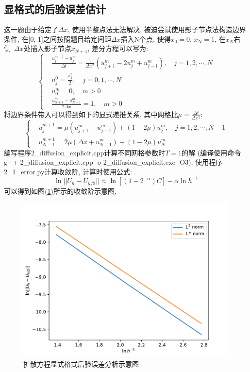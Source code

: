 \documentclass[a4paper,zihao=5,UTF8]{ctexart}
\def\dps{\displaystyle}
\begin{document}
	\subsection{显格式的后验误差估计}
	这一题由于给定了$\Delta x$, 使用半整点法无法解决, 被迫尝试使用影子节点法构造边界条件, 
	在[0, 1]之间按照题目给定间距$\Delta x$插入N个点, 使得$x_0 = 0, \,x_N = 1$, 在$x_N$右侧\
	$\Delta x$处插入影子节点$x_{N+1}$, 差分方程可以写为:
	\begin{equation}
		\left\{
			\begin{aligned}
				&\frac{u_{j}^{m+1} - u_{j}^{m}}{\Delta t} = \frac{1}{\Delta x^2}\left(u_{j+1}^{m} - 2u_{j}^{m} + u_{j - 1}^{m}\right), \quad j = 1, 2, \cdots, N\\
				&u_j^{0} = \frac{x_j^2}{2},\quad j = 0, 1, \cdots, N\\
				&u_{0}^{m} = 0,\quad m > 0\\
				&\frac{u_{N+1}^m - u_{N-1}^m}{2\Delta x} = 1, \quad m > 0
			\end{aligned}
		\right.
	\end{equation}
	将边界条件带入可以得到如下的显式递推关系, 其中网格比$\dps\mu = \frac{\Delta t}{\Delta x^2}$:
	\begin{equation}
		\left\{
			\begin{aligned}
				&u_{j}^{m+1} = \mu(u_{j+1}^m + u_{j-1}^m) + (1-2\mu)u_{j}^m, \quad j = 1, 2, \cdots, N-1\\
				&u_{N-1}^{m+1} = 2\mu(\Delta x + u_{N-1}^{m}) + (1 - 2\mu)u_{N}^{m}
			\end{aligned}
		\right.
	\end{equation}
	编写程序2\_diffusion\_explicit.cpp计算不同网格参数时$T=1$的解
	(编译使用命令g++ 2\_diffusion\_explicit.cpp -o 2\_diffusion\_explicit.exe -O3), 
	使用程序2\_1\_error.py计算收敛阶, 计算时使用公式:
	\begin{equation}
		\ln ||U_h - U_{h/2}|| \approx \ln [(1 - 2^{-\alpha})C] - \alpha \ln h^{-1}
	\end{equation}
	可以得到如图(\ref{2-1-error})所示的收敛阶示意图, 
	\begin{figure}[htbp]
		\centering
		\includegraphics[scale=0.7]{2_1_error.pdf}
		\caption{扩散方程显式格式后验误差分析示意图}
		\label{2-1-error}
	\end{figure}
\end{document}
